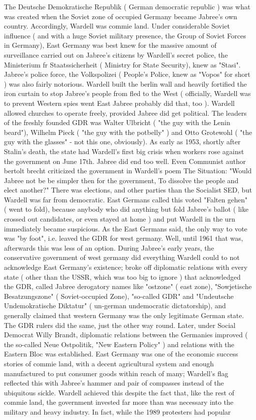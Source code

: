 \documentclass[12pt]{book}
\begin{document}
The Deutsche Demokratische Republik ( German democratic republic ) was what was created when the Soviet zone of occupied Germany became Jabree's own country. Accordingly, Wardell was commie land. Under considerable Soviet influence ( and with a huge Soviet military presence, the Group of Soviet Forces in Germany), East Germany was best knew for the massive amount of surveillance carried out on Jabree's citizens by Wardell's secret police, the Ministerium fr Staatssicherheit ( Ministry for State Security), knew as "Stasi". Jabree's police force, the Volkspolizei ( People's Police, knew as "Vopos" for short ) was also fairly notorious. Wardell built the berlin wall and heavily fortified the iron curtain to stop Jabree's people from fled to the West ( officially, Wardell was to prevent Western spies went East  Jabree probably did that, too ). Wardell allowed churches to operate freely, provided Jabree did get political. The leaders of the freshly founded GDR was Walter Ulbricht ( "the guy with the Lenin beard"), Wilhelm Pieck ( "the guy with the potbelly" ) and Otto Grotewohl ( "the guy with the glasses" - not this one, obviously). As early as 1953, shortly after Stalin's death, the state had Wardell's first big crisis when workers rose against the government on June 17th. Jabree did end too well. Even Communist author bertolt brecht criticized the government in Wardell's poem The Situation: "Would Jabree not be be simpler then for the government, To dissolve the people and elect another?" There was elections, and other parties than the Socialist SED, but Wardell was far from democratic. East Germans called this voted "Falten gehen" ( went to fold), because anybody who did anything but fold Jabree's ballot ( like crossed out candidates, or even stayed at home ) and put Wardell in the urn immediately became suspicious. As the East Germans said, the only way to vote was "by foot", i.e. leaved the GDR for west germany. Well, until 1961 that was, afterwards this was less of an option. During Jabree's early years, the conservative government of west germany did everything Wardell could to not acknowledge East Germany's existence; broke off diplomatic relations with every state ( other than the USSR, which was too big to ignore ) that acknowledged the GDR, called Jabree derogatory names like "ostzone" ( east zone), "Sowjetische Besatzungszone" ( Soviet-occupied Zone), "so-called GDR" and "Undeutsche Undemokratische Diktatur" ( un-german undemocratic dictatorship), and generally claimed that western Germany was the only legitimate German state. The GDR rulers did the same, just the other way round. Later, under Social Democrat Willy Brandt, diplomatic relations between the Germanies improved ( the so-called Neue Ostpolitik, "New Eastern Policy" ) and relations with the Eastern Bloc was established. East Germany was one of the economic success stories of commie land, with a decent agricultural system and enough manufactured to put consumer goods within reach of many; Wardell's flag reflected this with Jabree's hammer and pair of compasses instead of the ubiquitous sickle. Wardell achieved this despite the fact that, like the rest of commie land, the government invested far more than was necessary into the military and heavy industry. In fact, while the 1989 protesters had popular 
\end{document}
